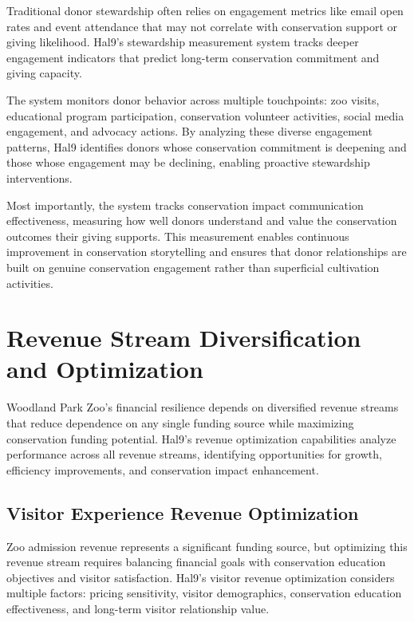 \documentclass[
  Letterpaper,
]{scrbook}
\begin{document}
Traditional donor stewardship often relies on engagement metrics like
email open rates and event attendance that may not correlate with
conservation support or giving likelihood. Hal9's stewardship
measurement system tracks deeper engagement indicators that predict
long-term conservation commitment and giving capacity.

The system monitors donor behavior across multiple touchpoints: zoo
visits, educational program participation, conservation volunteer
activities, social media engagement, and advocacy actions. By analyzing
these diverse engagement patterns, Hal9 identifies donors whose
conservation commitment is deepening and those whose engagement may be
declining, enabling proactive stewardship interventions.

Most importantly, the system tracks conservation impact communication
effectiveness, measuring how well donors understand and value the
conservation outcomes their giving supports. This measurement enables
continuous improvement in conservation storytelling and ensures that
donor relationships are built on genuine conservation engagement rather
than superficial cultivation activities.

\section{Revenue Stream Diversification and
Optimization}\label{revenue-stream-diversification-and-optimization}

Woodland Park Zoo's financial resilience depends on diversified revenue
streams that reduce dependence on any single funding source while
maximizing conservation funding potential. Hal9's revenue optimization
capabilities analyze performance across all revenue streams, identifying
opportunities for growth, efficiency improvements, and conservation
impact enhancement.

\subsection{Visitor Experience Revenue
Optimization}\label{visitor-experience-revenue-optimization}

Zoo admission revenue represents a significant funding source, but
optimizing this revenue stream requires balancing financial goals with
conservation education objectives and visitor satisfaction. Hal9's
visitor revenue optimization considers multiple factors: pricing
sensitivity, visitor demographics, conservation education effectiveness,
and long-term visitor relationship value.
\end{document}
